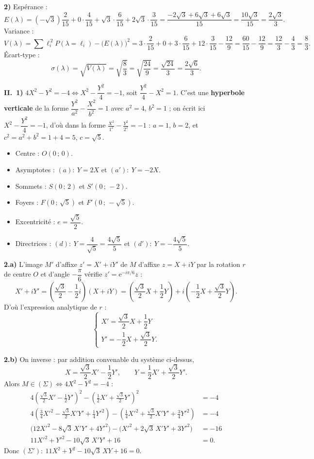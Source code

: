 \noindent\textbf{2)} Espérance :
\[
E(\lambda)=(-\sqrt3)\frac{2}{15}+0\cdot\frac{4}{15}+\sqrt3\cdot\frac{6}{15}+2\sqrt3\cdot\frac{3}{15}
=\frac{-2\sqrt3+6\sqrt3+6\sqrt3}{15}=\frac{10\sqrt3}{15}=\frac{2\sqrt3}{3}.
\]
Variance :
\[
V(\lambda)=\sum \ell_i^{\,2}P(\lambda=\ell_i)-\big(E(\lambda)\big)^2
=3\cdot\frac{2}{15}+0+3\cdot\frac{6}{15}+12\cdot\frac{3}{15}-\frac{12}{9}
=\frac{60}{15}-\frac{12}{9}=\frac{12}{3}-\frac{4}{3}=\frac{8}{3}.
\]
Écart-type :
\[
\sigma(\lambda)=\sqrt{V(\lambda)}=\sqrt{\frac{8}{3}}=\sqrt{\frac{24}{9}}=\frac{\sqrt{24}}{3}=\frac{2\sqrt6}{3}.
\]

\smallskip
\noindent\textbf{II.\ 1)} $4X^2-Y^2=-4\iff X^2-\dfrac{Y^2}{4}=-1$, soit $\dfrac{Y^2}{4}-X^2=1$. C'est une \textbf{hyperbole verticale} de la forme $\dfrac{Y^2}{a^2}-\dfrac{X^2}{b^2}=1$ avec $a^2=4$, $b^2=1$ ; on écrit ici $X^2-\dfrac{Y^2}{4}=-1$, d'où dans la forme $\frac{X^2}{1^2}-\frac{Y^2}{2^2}=-1$ : $a=1$, $b=2$, et $c^2=a^2+b^2=1+4=5$, $c=\sqrt5$.
\begin{itemize}
\item Centre : $O(0\,;\,0)$.
\item Asymptotes : $(a):\ Y=2X$ et $(a'):\ Y=-2X$.
\item Sommets : $S(0\,;\,2)$ et $S'(0\,;\,-2)$.
\item Foyers : $F(0\,;\,\sqrt5)$ et $F'(0\,;\,-\sqrt5)$.
\item Excentricité : $e=\dfrac{\sqrt5}{2}$.
\item Directrices : $(d):\ Y=\dfrac{4}{\sqrt5}=\dfrac{4\sqrt5}{5}$ et $(d'):\ Y=-\dfrac{4\sqrt5}{5}$.
\end{itemize}

\noindent\textbf{2.a)} L'image $M'$ d'affixe $z'=X'+iY'$ de $M$ d'affixe $z=X+iY$ par la rotation $r$ de centre $O$ et d'angle $-\dfrac{\pi}{6}$ vérifie $z'=\mathrm e^{-i\pi/6}z$ :
\[
X'+iY'=\left(\frac{\sqrt3}{2}-\frac12 i\right)(X+iY)
=\left(\frac{\sqrt3}{2}X+\frac12 Y\right)+i\left(-\frac12 X+\frac{\sqrt3}{2}Y\right).
\]
D'où l'expression analytique de $r$ :
\[
\begin{cases}X'=\dfrac{\sqrt3}{2}X+\dfrac12 Y\\[4pt]Y'=-\dfrac12 X+\dfrac{\sqrt3}{2}Y.\end{cases}
\]

\noindent\textbf{2.b)} On inverse : par addition convenable du système ci-dessus,
\[
X=\frac{\sqrt3}{2}X'-\frac12 Y',\qquad Y=\frac12 X'+\frac{\sqrt3}{2}Y'.
\]
Alors $M\in(\Sigma)\iff 4X^2-Y^2=-4$ :
\begin{align*}
4\left(\frac{\sqrt3}{2}X'-\frac12 Y'\right)^2-\left(\frac12 X'+\frac{\sqrt3}{2}Y'\right)^2&=-4\\
4\left(\frac34 X'^2-\frac{\sqrt3}{2}X'Y'+\frac14 Y'^2\right)-\left(\frac14 X'^2+\frac{\sqrt3}{2}X'Y'+\frac34 Y'^2\right)&=-4\\
\big(12X'^2-8\sqrt3\,X'Y'+4Y'^2\big)-\big(X'^2+2\sqrt3\,X'Y'+3Y'^2\big)&=-16\\
11X'^2+Y'^2-10\sqrt3\,X'Y'+16&=0 .
\end{align*}
Donc $(\Sigma'):\ 11X^2+Y^2-10\sqrt3\,XY+16=0$.

